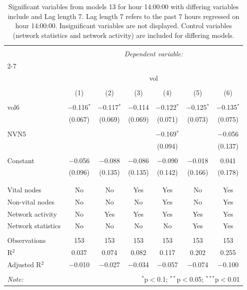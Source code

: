 
\begin{table}[!htbp] \centering 
  \caption{Significant variables from models 13 for hour 14:00:00 with differing variables include 
                               and Lag length 7. Lag length 7 refers to the past 7 hours regressed on hour 14:00:00. 
                               Insignificant variables are not displayed. 
                               Control variables (network statistics and network activity) are 
                               included for differing models.} 
  \label{Volumemodels1_t_hourlagged1} 
\scriptsize 
\begin{tabular}{@{\extracolsep{5pt}}lcccccc} 
\\[-1.8ex]\hline 
\hline \\[-1.8ex] 
 & \multicolumn{6}{c}{\textit{Dependent variable:}} \\ 
\cline{2-7} 
\\[-1.8ex] & \multicolumn{6}{c}{vol} \\ 
\\[-1.8ex] & (1) & (2) & (3) & (4) & (5) & (6)\\ 
\hline \\[-1.8ex] 
 vol6 & $-$0.116$^{*}$ & $-$0.117$^{*}$ & $-$0.114 & $-$0.122$^{*}$ & $-$0.125$^{*}$ & $-$0.135$^{*}$ \\ 
  & (0.067) & (0.069) & (0.069) & (0.071) & (0.073) & (0.075) \\ 
  & & & & & & \\ 
 NVN5 &  &  &  & $-$0.169$^{*}$ &  & $-$0.056 \\ 
  &  &  &  & (0.094) &  & (0.137) \\ 
  & & & & & & \\ 
 Constant & $-$0.056 & $-$0.088 & $-$0.086 & $-$0.090 & $-$0.018 & 0.041 \\ 
  & (0.096) & (0.135) & (0.135) & (0.142) & (0.166) & (0.178) \\ 
  & & & & & & \\ 
\hline \\[-1.8ex] 
Vital nodes & No & No & Yes & Yes & No & Yes \\ 
Non-vital nodes & No & No & No & Yes & No & Yes \\ 
Network activity & No & Yes & Yes & Yes & Yes & Yes \\ 
Network statistics & No & No & No & No & Yes & Yes \\ 
\hline &  &  &  &  &  &  \\ 
Observations & 153 & 153 & 153 & 153 & 153 & 153 \\ 
R$^{2}$ & 0.037 & 0.074 & 0.082 & 0.117 & 0.202 & 0.255 \\ 
Adjusted R$^{2}$ & $-$0.010 & $-$0.027 & $-$0.034 & $-$0.057 & $-$0.074 & $-$0.100 \\ 
\hline 
\hline \\[-1.8ex] 
\textit{Note:}  & \multicolumn{6}{r}{$^{*}$p$<$0.1; $^{**}$p$<$0.05; $^{***}$p$<$0.01} \\ 
\end{tabular} 
\end{table} 
